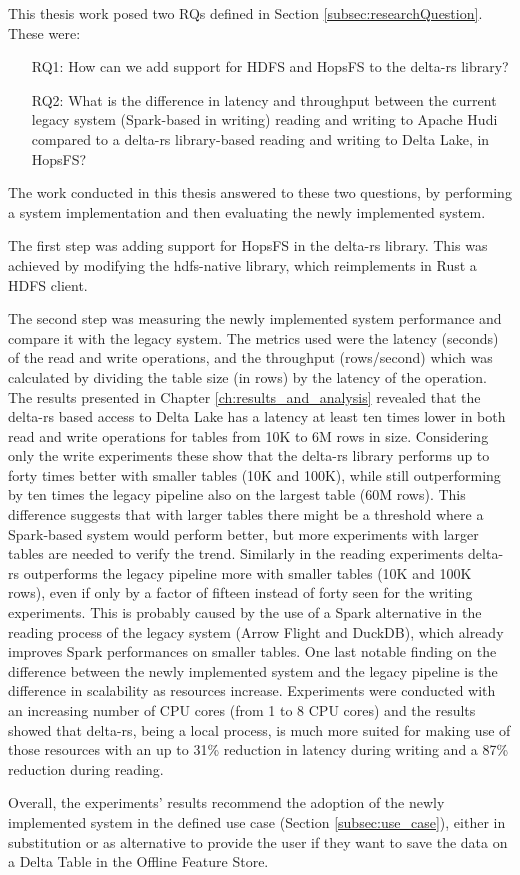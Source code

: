 This thesis work posed two \glspl{RQ} defined in Section \ref{subsec:researchQuestion}. These were: 
\begin{enumerate}
    \item[RQ1:] How can we add support for \gls{HDFS} and \gls{HopsFS} to the delta-rs library?
    \item[RQ2:] What is the difference in latency and throughput between the current legacy system (Spark-based in writing) reading and writing to Apache Hudi compared to a delta-rs library-based reading and writing to Delta Lake, in \gls{HopsFS}?
\end{enumerate}
The work conducted in this thesis answered to these two questions, by performing a system implementation and then evaluating the newly implemented system. 

The first step was adding support for \gls{HopsFS} in the delta-rs library. This was achieved by modifying the hdfs-native \cite{binfordKimahrimanHdfsnative2024} library, which reimplements in Rust a \gls{HDFS} client. 

The second step was measuring the newly implemented system performance and compare it with the legacy system. The metrics used were the latency (seconds) of the read and write operations, and the throughput (rows/second) which was calculated by dividing the table size (in rows) by the latency of the operation. The results presented in Chapter \ref{ch:results_and_analysis} revealed that the delta-rs based access to Delta Lake has a latency at least ten times lower in both read and write operations for tables from 10K to 6M rows in size. Considering only the write experiments these show that the delta-rs library performs up to forty times better with smaller tables (10K and 100K), while still outperforming by ten times the legacy pipeline also on the largest table (60M rows). This difference suggests that with larger tables there might be a threshold where a Spark-based system would perform better, but more experiments with larger tables are needed to verify the trend. Similarly in the reading experiments delta-rs outperforms the legacy pipeline more with smaller tables (10K and 100K rows), even if only by a factor of fifteen instead of forty seen for the writing experiments. This is probably caused by the use of a Spark alternative in the reading process of the legacy system (Arrow Flight and DuckDB), which already improves Spark performances on smaller tables. One last notable finding on the difference between the newly implemented system and the legacy pipeline is the difference in scalability as resources increase. Experiments were conducted with an increasing number of \gls{CPU} cores (from 1 to 8 \gls{CPU} cores) and the results showed that delta-rs, being a local process, is much more suited for making use of those resources with an up to 31\% reduction in latency during writing and a 87\% reduction during reading.

Overall, the experiments' results recommend the adoption of the newly implemented system in the defined use case (Section \ref{subsec:use_case}), either in substitution or as alternative to provide the user if they want to save the data on a Delta Table in the Offline Feature Store.
